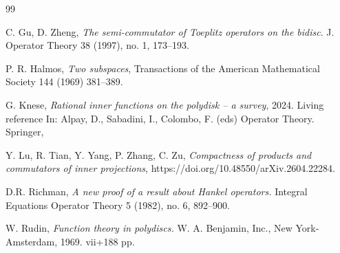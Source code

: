 \documentclass[12pt, a4 paper]{amsart}
\theoremstyle{definition}
\theoremstyle{plain}
\theoremstyle{definition}
\numberwithin{equation}{section}
\begin{document}
\begin{thebibliography}{99}

 C. Gu, D. Zheng,
\emph{The semi-commutator of Toeplitz operators on the bidisc}. J. Operator Theory 38 (1997), no. 1, 173--193.

P. R. Halmos, 
\emph{Two subspaces}, Transactions of the American Mathematical Society 144 (1969) 381--389.


G. Knese,
\emph{Rational inner functions on the polydisk -- a survey}, 2024. Living reference In: Alpay, D., Sabadini, I., Colombo, F. (eds) Operator Theory. Springer, 

Y. Lu, R. Tian, Y. Yang, P. Zhang, C. Zu,
\emph{Compactness of products and commutators of inner projections}, https://doi.org/10.48550/arXiv.2604.22284.






D.R. Richman, 
\emph{A new proof of a result about Hankel operators.}
Integral Equations Operator Theory 5 (1982), no. 6, 892--900.

W. Rudin, 
\emph{Function theory in polydiscs.}
W. A. Benjamin, Inc., New York-Amsterdam, 1969. vii+188 pp.



\end{thebibliography}
\end{document}
